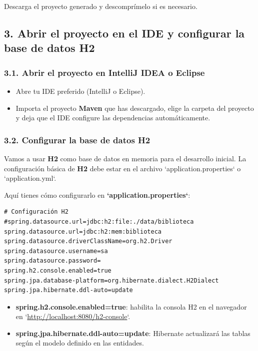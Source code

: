 \documentclass[11pt]{article}
\begin{document}
Descarga el proyecto generado y descomprímelo si es necesario.

\subsection{3. Abrir el proyecto en el IDE y configurar la base de datos H2}
\label{sec:orgce61b18}

\subsubsection{3.1. Abrir el proyecto en IntelliJ IDEA o Eclipse}
\label{sec:orgd30923e}
\begin{itemize}
\item Abre tu IDE preferido (IntelliJ o Eclipse).
\item Importa el proyecto \textbf{\textbf{Maven}} que has descargado, elige la carpeta del proyecto y deja que el IDE configure las dependencias automáticamente.
\end{itemize}

\subsubsection{3.2. Configurar la base de datos H2}
\label{sec:org2a217dd}
Vamos a usar \textbf{\textbf{H2}} como base de datos en memoria para el desarrollo inicial. La configuración básica de \textbf{\textbf{H2}} debe estar en el archivo `application.properties` o `application.yml`.

Aquí tienes cómo configurarlo en \textbf{\textbf{`application.properties`}}:

\begin{verbatim}
# Configuración H2
#spring.datasource.url=jdbc:h2:file:./data/biblioteca
spring.datasource.url=jdbc:h2:mem:biblioteca
spring.datasource.driverClassName=org.h2.Driver
spring.datasource.username=sa
spring.datasource.password=
spring.h2.console.enabled=true
spring.jpa.database-platform=org.hibernate.dialect.H2Dialect
spring.jpa.hibernate.ddl-auto=update
\end{verbatim}

\begin{itemize}
\item \textbf{\textbf{spring.h2.console.enabled=true}}: habilita la consola H2 en el navegador en `\url{http://localhost:8080/h2-console}`.
\item \textbf{\textbf{spring.jpa.hibernate.ddl-auto=update}}: Hibernate actualizará las tablas según el modelo definido en las entidades.
\end{itemize}
\end{document}
